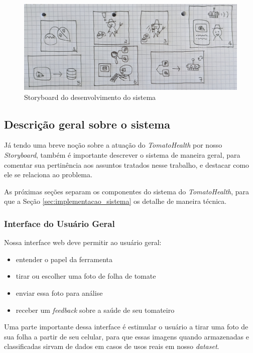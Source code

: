 \begin{figure}[ht]
    \centering
    \includegraphics[width=\textwidth]{images/storyboard.jpg}
    \caption{Storyboard do desenvolvimento do sistema}
    \label{fig:storyboard}
\end{figure}

\subsection{{Descrição geral sobre o sistema}}

Já tendo uma breve noção sobre a atuação do \emph{TomatoHealth} por nosso \textit{Storyboard}, também é importante descrever o sistema de maneira geral, para comentar sua pertinência aos assuntos tratados nesse trabalho, e destacar como ele se relaciona ao problema.

As próximas seções separam os componentes do sistema do \emph{TomatoHealth}, para que a Seção \ref{sec:implementacao_sistema} os detalhe de maneira técnica.

\subsubsection{{Interface do Usuário Geral} \label{sec:abst-geral}}

Nossa interface web deve permitir ao usuário geral:

\begin{itemize}
    \item entender o papel da ferramenta
    \item tirar ou escolher uma foto de folha de tomate
    \item enviar essa foto para análise
    \item receber um \textit{feedback} sobre a saúde de seu tomateiro
\end{itemize}

Uma parte importante dessa interface é estimular o usuário a tirar uma foto de sua folha a partir de seu celular, para que essas imagens quando armazenadas e classificadas sirvam de dados em casos de usos reais em nosso \textit{dataset}.

